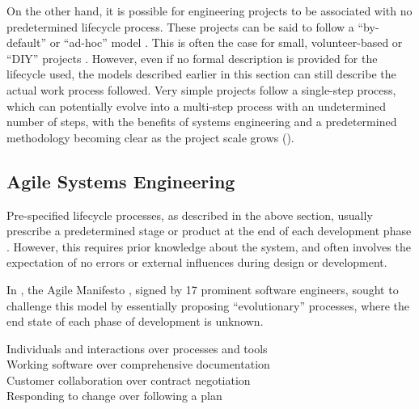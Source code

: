 \documentclass[a4paper,nobib,justified,final]{tufte-book}
\begin{document}
On the other hand, it is possible for engineering projects to be associated with no predetermined lifecycle process.
These projects can be said to follow a ``by-default'' or ``ad-hoc'' model \autocite{cowper941SystemsEngineering2004}.
This is often the case for small, volunteer-based or ``\ac{DIY}'' projects \autocite{bohmerOpenInnovationEcosystem}. However, even if no formal description is provided for the lifecycle used, the models described earlier in this section can still describe the actual work process followed. Very simple projects follow a single-step process, which can potentially evolve into a multi-step process with an undetermined number of steps, with the benefits of systems engineering and a predetermined methodology becoming clear as the project scale grows ().

\subsection{Agile Systems Engineering}

Pre-specified lifecycle processes, as described in the above section, usually prescribe a predetermined stage or product at the end of each development phase \autocite{sebok_incremental}.
However, this requires prior knowledge about the system, and often involves the expectation of no errors or external influences during design or development.

In \citeyear{beckAgileManifesto2001}, the Agile Manifesto \autocite{beckAgileManifesto2001}, signed by 17 prominent software engineers, sought to challenge this model by essentially proposing ``evolutionary'' processes, where the end state of each phase of development is unknown.

\begin{marginfigure}
	\begin{tcolorbox}[colback=white, colframe=black, sharp corners, boxrule=0.5pt, width=\linewidth]
	\small Individuals and interactions over processes and tools\\%
	Working software over comprehensive documentation\\%
Customer collaboration over contract negotiation\\%
Responding to change over following a plan%
	\end{tcolorbox}
	\caption[The Agile Manifesto]{The Agile Manifesto \autocite{beckAgileManifesto2001}}
\end{marginfigure}
\end{document}
